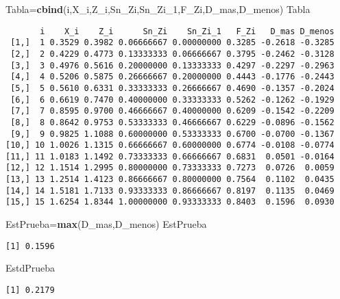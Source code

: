 \documentclass[
  a4paper,
  oneside,
  openany]{book}
\newenvironment{Shaded}{\begin{snugshade}}{\end{snugshade}}
\newcommand{\FunctionTok}[1]{\textcolor[rgb]{0.13,0.29,0.53}{\textbf{#1}}}
\newcommand{\NormalTok}[1]{#1}
\newcommand{\OtherTok}[1]{\textcolor[rgb]{0.56,0.35,0.01}{#1}}
\begin{document}
\begin{Shaded}
\begin{Highlighting}[]
\NormalTok{Tabla}\OtherTok{=}\FunctionTok{cbind}\NormalTok{(i,X\_i,Z\_i,Sn\_Zi,Sn\_Zi\_1,F\_Zi,D\_mas,D\_menos)                                                                                                                                                      }
\NormalTok{Tabla}
\end{Highlighting}
\end{Shaded}

\begin{verbatim}
       i    X_i    Z_i      Sn_Zi    Sn_Zi_1   F_Zi   D_mas D_menos
 [1,]  1 0.3529 0.3982 0.06666667 0.00000000 0.3285 -0.2618 -0.3285
 [2,]  2 0.4229 0.4773 0.13333333 0.06666667 0.3795 -0.2462 -0.3128
 [3,]  3 0.4976 0.5616 0.20000000 0.13333333 0.4297 -0.2297 -0.2963
 [4,]  4 0.5206 0.5875 0.26666667 0.20000000 0.4443 -0.1776 -0.2443
 [5,]  5 0.5610 0.6331 0.33333333 0.26666667 0.4690 -0.1357 -0.2024
 [6,]  6 0.6619 0.7470 0.40000000 0.33333333 0.5262 -0.1262 -0.1929
 [7,]  7 0.8595 0.9700 0.46666667 0.40000000 0.6209 -0.1542 -0.2209
 [8,]  8 0.8642 0.9753 0.53333333 0.46666667 0.6229 -0.0896 -0.1562
 [9,]  9 0.9825 1.1088 0.60000000 0.53333333 0.6700 -0.0700 -0.1367
[10,] 10 1.0026 1.1315 0.66666667 0.60000000 0.6774 -0.0108 -0.0774
[11,] 11 1.0183 1.1492 0.73333333 0.66666667 0.6831  0.0501 -0.0164
[12,] 12 1.1514 1.2995 0.80000000 0.73333333 0.7273  0.0726  0.0059
[13,] 13 1.2514 1.4123 0.86666667 0.80000000 0.7564  0.1102  0.0435
[14,] 14 1.5181 1.7133 0.93333333 0.86666667 0.8197  0.1135  0.0469
[15,] 15 1.6254 1.8344 1.00000000 0.93333333 0.8403  0.1596  0.0930
\end{verbatim}

\begin{Shaded}
\begin{Highlighting}[]
\NormalTok{EstPrueba}\OtherTok{=}\FunctionTok{max}\NormalTok{(D\_mas,D\_menos)}
\NormalTok{EstPrueba}
\end{Highlighting}
\end{Shaded}

\begin{verbatim}
[1] 0.1596
\end{verbatim}

\begin{Shaded}
\begin{Highlighting}[]
\NormalTok{EstdPrueba}
\end{Highlighting}
\end{Shaded}

\begin{verbatim}
[1] 0.2179
\end{verbatim}
\end{document}
